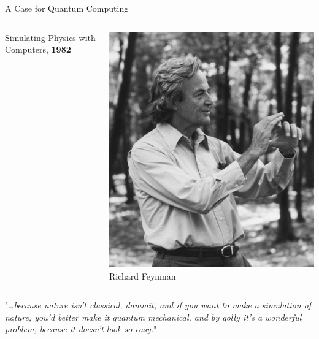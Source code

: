 \documentclass{beamer}
\begin{document}
\begin{frame}{A Case for Quantum Computing}

  \begin{minipage}[0.3\textheight]{\textwidth}
  \begin{columns}[c]
  \begin{column}{0.62\textwidth}
          Simulating Physics with Computers, \textbf{1982}
  \end{column}
  \begin{column}{0.39\textwidth}
    \includegraphics[scale=1]{images/feynman.jpg}
    \tiny{Richard Feynman}
  \end{column}
  \end{columns}
  \end{minipage}

  \vfill
  \begin{center}
  \scriptsize{
          "\dots \emph{because nature isn't
                  classical, dammit, and if you want to make a simulation of nature, you'd
                  better make it quantum mechanical, and by golly it's a wonderful problem,
                  because it doesn't look so easy.}"
  }
  \end{center}
\end{frame}
\end{document}
